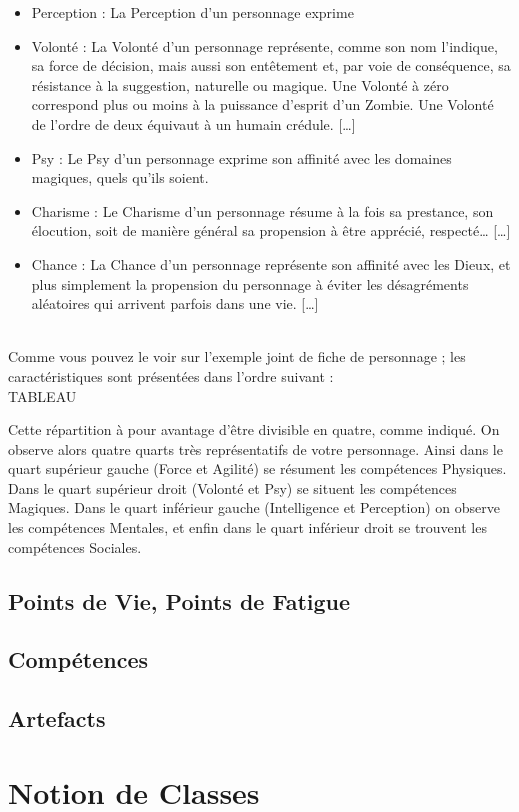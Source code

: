 \begin{itemize}
\item{Perception :} La Perception d’un personnage exprime 
\item{Volonté :} La Volonté d’un personnage représente, comme son nom l’indique, sa force de décision, mais aussi son entêtement et, par voie de conséquence, sa résistance à la suggestion, naturelle ou magique. Une Volonté à zéro correspond plus ou moins à la puissance d’esprit d’un Zombie. Une Volonté de l’ordre de deux équivaut à un humain crédule. […]
\item{Psy :} Le Psy d’un personnage exprime son affinité avec les domaines magiques, quels qu’ils soient. 
\item{Charisme :} Le Charisme d’un personnage résume à la fois sa prestance, son élocution, soit de manière général sa propension à être apprécié, respecté… […]
\item{Chance :} La Chance d’un personnage représente son affinité avec les Dieux, et plus simplement la propension du personnage à éviter les désagréments aléatoires qui arrivent parfois dans une vie. […]\end{itemize}
\\
Comme vous pouvez le voir sur l’exemple joint de fiche de personnage ; les caractéristiques sont présentées dans l’ordre suivant :\\

TABLEAU

Cette répartition à pour avantage d’être divisible en quatre, comme indiqué. On observe alors quatre quarts très représentatifs de votre personnage. Ainsi dans le quart supérieur gauche (Force et Agilité) se résument les compétences Physiques. Dans le quart supérieur droit (Volonté et Psy) se situent les compétences Magiques. Dans le quart inférieur gauche (Intelligence et Perception) on observe les compétences Mentales, et enfin dans le quart inférieur droit se trouvent les compétences Sociales.
\subsection{Points de Vie, Points de Fatigue}
\subsection{Compétences}
\subsection{Artefacts}
\section{Notion de Classes}
